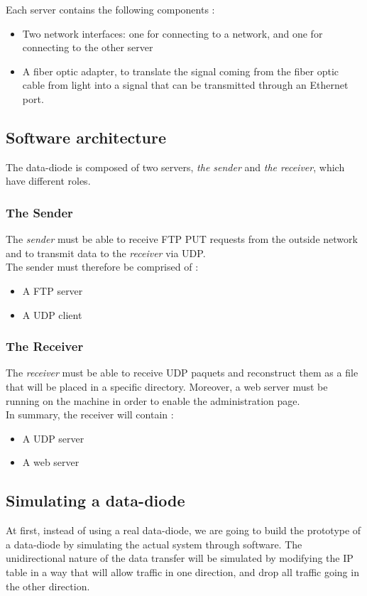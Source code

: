 \documentclass[a4paper,11pt]{article}
\begin{document}
Each server contains the following components :
\begin{itemize}
\item{Two network interfaces: one for connecting to a network, and one for connecting to the other server}
\item{A fiber optic adapter, to translate the signal coming from the fiber optic cable from light into a signal that can be transmitted through an Ethernet port.}
\end{itemize}

\subsection{Software architecture}
The data-diode is composed of two servers, \textit{the sender} and \textit{the receiver}, which have different roles. 

\subsubsection{The Sender}
The \textit{sender} must be able to receive FTP PUT requests from the outside network and to transmit data to the \textit{receiver} via UDP.\\

The sender must therefore be comprised of :
\begin{itemize}
\item{A FTP server}
\item{A UDP client}
\end{itemize} 

\subsubsection{The Receiver}
The \textit{receiver} must be able to receive UDP paquets and reconstruct them as a file that will be placed in a specific directory. Moreover, a web server must be running on the machine in order to enable the administration page.\\

In summary, the receiver will contain :
\begin{itemize}
\item{A UDP server}
\item{A web server}
\end{itemize}

\subsection{Simulating a data-diode}
At first, instead of using a real data-diode, we are going to build the prototype of a data-diode by simulating the actual system through software. The unidirectional nature of the data transfer will be simulated by modifying the IP table in a way that will allow traffic in one direction, and drop all traffic going in the other direction.
\end{document}
